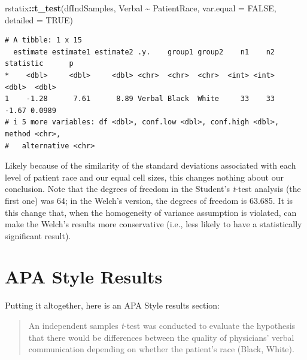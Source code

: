 \documentclass[
  11pt,
]{book}
\newenvironment{Shaded}{\begin{snugshade}}{\end{snugshade}}
\newcommand{\AttributeTok}[1]{\textcolor[rgb]{0.27,0.27,0.27}{#1}}
\newcommand{\ConstantTok}[1]{\textcolor[rgb]{0.37,0.37,0.37}{#1}}
\newcommand{\FunctionTok}[1]{\textcolor[rgb]{0.27,0.27,0.27}{\textbf{#1}}}
\newcommand{\NormalTok}[1]{#1}
\newcommand{\SpecialCharTok}[1]{\textcolor[rgb]{0.43,0.43,0.43}{\textbf{#1}}}
\begin{document}
\begin{Shaded}
\begin{Highlighting}[]
\NormalTok{rstatix}\SpecialCharTok{::}\FunctionTok{t\_test}\NormalTok{(dfIndSamples, Verbal }\SpecialCharTok{\textasciitilde{}}\NormalTok{ PatientRace, }\AttributeTok{var.equal =} \ConstantTok{FALSE}\NormalTok{,}
    \AttributeTok{detailed =} \ConstantTok{TRUE}\NormalTok{)}
\end{Highlighting}
\end{Shaded}

\begin{verbatim}
# A tibble: 1 x 15
  estimate estimate1 estimate2 .y.    group1 group2    n1    n2 statistic      p
*    <dbl>     <dbl>     <dbl> <chr>  <chr>  <chr>  <int> <int>     <dbl>  <dbl>
1    -1.28      7.61      8.89 Verbal Black  White     33    33     -1.67 0.0989
# i 5 more variables: df <dbl>, conf.low <dbl>, conf.high <dbl>, method <chr>,
#   alternative <chr>
\end{verbatim}

Likely because of the similarity of the standard deviations associated with each level of patient race and our equal cell sizes, this changes nothing about our conclusion. Note that the degrees of freedom in the Student's \emph{t}-test analysis (the first one) was 64; in the Welch's version, the degrees of freedom is 63.685. It is this change that, when the homogeneity of variance assumption is violated, can make the Welch's results more conservative (i.e., less likely to have a statistically significant result).

\hypertarget{apa-style-results-1}{%
\section{APA Style Results}\label{apa-style-results-1}}

Putting it altogether, here is an APA Style results section:

\begin{quote}
An independent samples \emph{t}-test was conducted to evaluate the hypothesis that there would be differences between the quality of physicians' verbal communication depending on whether the patient's race (Black, White).
\end{quote}
\end{document}
